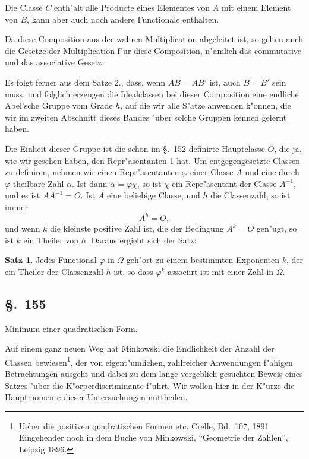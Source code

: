 \documentclass[12pt,a4paper]{article}
\theoremstyle{definition}
\newtheorem*{satz}{Satz}
\begin{document}
Die Classe $C$ enth"alt alle Producte eines Elementes von $A$ mit einem Element von $B$, kann aber auch noch andere Functionale enthalten.

Da diese Composition aus der wahren Multiplication abgeleitet ist, so gelten auch die Gesetze der Multiplication f"ur diese Composition, n"amlich das commutative und das associative Gesetz.

Es folgt ferner aus dem Satze 2., dass, wenn $AB = AB'$ ist, auch $B = B'$ sein muss, und folglich erzeugen die Idealclassen bei dieser Composition eine endliche Abel'sche Gruppe vom Grade $h$, auf die wir alle S"atze anwenden k"onnen, die wir im zweiten Abschnitt dieses Bandes "uber solche Gruppen kennen gelernt haben.

Die Einheit dieser Gruppe ist die schon im \S.~152 definirte Hauptclasse $O$, die ja, wie wir gesehen haben, den Repr"asentanten 1 hat. Um entgegengesetzte Classen zu definiren, nehmen wir einen Repr"asentanten $\varphi$ einer Classe $A$ und eine durch $\varphi$ theilbare Zahl $\alpha$. Ist dann $\alpha = \varphi\chi$, so ist $\chi$ ein Repr"asentant der Classe $A^{-1}$, und es ist $AA^{-1} = O$. Ist $A$ eine beliebige Classe, und $h$ die Classenzahl, so ist immer
\begin{equation}
A^h = O,
\end{equation}
und wenn $k$ die kleinste positive Zahl ist, die der Bedingung $A^k = O$ gen"ugt, so ist $k$ ein Theiler von $h$. Daraus ergiebt sich der Satz:

\begin{satz}
Jedes Functional $\varphi$ in $\Omega$ geh"ort zu einem bestimmten Exponenten $k$, der ein Theiler der Classenzahl $h$ ist, so dass $\varphi^k$ associirt ist mit einer Zahl in $\Omega$.
\end{satz}

\subsection*{\S.~155}

Minimum einer quadratischen Form.

Auf einem ganz neuen Weg hat Minkowski die Endlichkeit der Anzahl der Classen bewiesen\footnote{Ueber die positiven quadratischen Formen etc. Crelle, Bd.~107, 1891. Eingehender noch in dem Buche von Minkowski, ``Geometrie der Zahlen'', Leipzig 1896.}, der von eigent"umlichen, zahlreicher Anwendungen f"ahigen Betrachtungen ausgeht und dabei zu dem lange vergeblich gesuchten Beweis eines Satzes "uber die K"orperdiscriminante f"uhrt. Wir wollen hier in der K"urze die Hauptmomente dieser Untersuchungen mittheilen.
\end{document}
